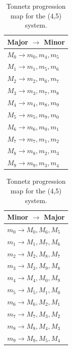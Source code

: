 \documentclass[11pt,letterpaper]{amsart}
\begin{document}
{\tiny \begin{table}[H]
    \centering
    \begin{minipage}{0.48\textwidth}
        \centering
        \begin{tabular}{l}
        \toprule
        \textbf{Major $\to$ Minor} \\
        \midrule
        $M_0 \to m_0, m_4, m_5$ \\
        $M_1 \to m_1, m_5, m_6$ \\
        $M_2 \to m_2, m_6, m_7$ \\
        $M_3 \to m_3, m_7, m_8$ \\
        $M_4 \to m_4, m_8, m_9$ \\
        $M_5 \to m_5, m_9, m_0$ \\
        $M_6 \to m_6, m_0, m_1$ \\
        $M_7 \to m_7, m_1, m_2$ \\
        $M_8 \to m_8, m_2, m_3$ \\
        $M_9 \to m_9, m_3, m_4$ \\
        \bottomrule
        \end{tabular}
    \end{minipage}\hfill
    \begin{minipage}{0.48\textwidth}
        \centering
        \begin{tabular}{l}
        \toprule
        \textbf{Minor $\to$ Major} \\
        \midrule
        $m_0 \to M_0, M_6, M_5$ \\
        $m_1 \to M_1, M_7, M_6$ \\
        $m_2 \to M_2, M_8, M_7$ \\
        $m_3 \to M_3, M_9, M_8$ \\
        $m_4 \to M_4, M_0, M_9$ \\
        $m_5 \to M_5, M_1, M_0$ \\
        $m_6 \to M_6, M_2, M_1$ \\
        $m_7 \to M_7, M_3, M_2$ \\
        $m_8 \to M_8, M_4, M_3$ \\
        $m_9 \to M_9, M_5, M_4$ \\
        \bottomrule
        \end{tabular}
    \end{minipage}
    \caption{Tonnetz progression map for the (4,5) system.}
\end{table}}
\end{document}
